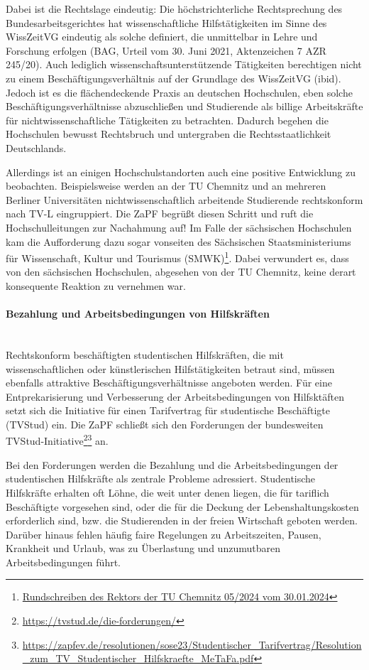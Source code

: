 \documentclass[DIV=calc]{scrartcl}
\begin{document}
Dabei ist die Rechtslage eindeutig: Die höchstrichterliche Rechtsprechung des Bundesarbeitsgerichtes hat wissenschaftliche Hilfstätigkeiten im Sinne des WissZeitVG eindeutig als solche definiert, die unmittelbar in Lehre und Forschung erfolgen (BAG, Urteil vom 30. Juni 2021, Aktenzeichen 7 AZR 245/20). Auch lediglich wissenschaftsunterstützende Tätigkeiten berechtigen nicht zu einem Beschäftigungsverhältnis auf der Grundlage des WissZeitVG (ibid). Jedoch ist es die flächendeckende Praxis an deutschen Hochschulen, eben solche Beschäftigungsverhältnisse abzuschließen und Studierende als billige Arbeitskräfte für nichtwissenschaftliche Tätigkeiten zu betrachten. Dadurch begehen die Hochschulen bewusst Rechtsbruch und untergraben die Rechtsstaatlichkeit Deutschlands.

Allerdings ist an einigen Hochschulstandorten auch eine positive Entwicklung zu beobachten. Beispielsweise werden an der TU Chemnitz und an mehreren Berliner Universitäten nichtwissenschaftlich arbeitende Studierende rechtskonform nach TV-L eingruppiert. Die ZaPF begrüßt diesen Schritt und ruft die Hochschulleitungen zur Nachahmung auf! Im Falle der sächsischen Hochschulen kam die Aufforderung dazu sogar vonseiten des Sächsischen Staatsministeriums für Wissenschaft, Kultur und Tourismus (SMWK)\footnote{\label{note1}\url{Rundschreiben des Rektors der TU Chemnitz 05/2024 vom 30.01.2024}}. Dabei verwundert es, dass von den sächsischen Hochschulen, abgesehen von der TU Chemnitz, keine derart konsequente Reaktion zu vernehmen war.

\paragraph{Bezahlung und Arbeitsbedingungen von Hilfskräften} \mbox{}\\
Rechtskonform beschäftigten studentischen Hilfskräften, die mit wissenschaftlichen oder künstlerischen Hilfstätigkeiten betraut sind, müssen ebenfalls attraktive Beschäftigungsverhältnisse angeboten werden. Für eine Entprekarisierung und Verbesserung der Arbeitsbedingungen von Hilfsktäften setzt sich die Initiative für einen Tarifvertrag für studentische Beschäftigte (TVStud) ein. Die ZaPF schließt sich den Forderungen der bundesweiten TVStud-Initiative\footnote{\url{https://tvstud.de/die-forderungen/}}\footnote{\url{https://zapfev.de/resolutionen/sose23/Studentischer_Tarifvertrag/Resolution_zum_TV_Studentischer_Hilfskraefte_MeTaFa.pdf}} an.

Bei den Forderungen werden die Bezahlung und die Arbeitsbedingungen der studentischen Hilfskräfte als zentrale Probleme adressiert. Studentische Hilfskräfte erhalten oft Löhne, die weit unter denen liegen, die für tariflich Beschäftigte vorgesehen sind, oder die für die Deckung der Lebenshaltungskosten erforderlich sind, bzw. die Studierenden in der freien Wirtschaft geboten werden. Darüber hinaus fehlen häufig faire Regelungen zu Arbeitszeiten, Pausen, Krankheit und Urlaub, was zu Überlastung und unzumutbaren Arbeitsbedingungen führt.
\end{document}
